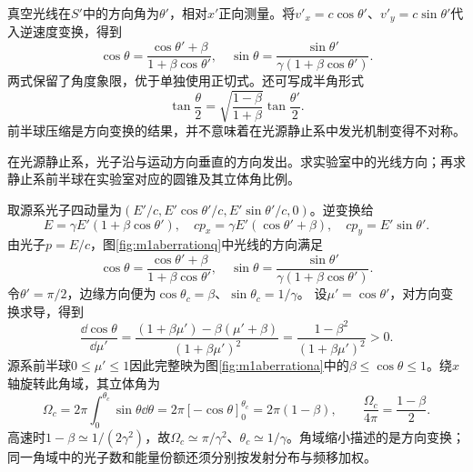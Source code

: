 真空光线在$S'$中的方向角为$\theta'$，相对$x'$正向测量。将$v'_x=c\cos\theta'$、$v'_y=c\sin\theta'$代入逆速度变换，得到
\begin{equation}\label{eq:m1aberration}
 \cos\theta=\frac{\cos\theta'+\beta}{1+\beta\cos\theta'},\quad
 \sin\theta=\frac{\sin\theta'}{\gamma(1+\beta\cos\theta')}.
\end{equation}
两式保留了角度象限，优于单独使用正切式。还可写成半角形式
\[
 \tan\frac\theta2=\sqrt{\frac{1-\beta}{1+\beta}}\tan\frac{\theta'}2.
\]
前半球压缩是方向变换的结果，并不意味着在光源静止系中发光机制变得不对称。

\begin{example}\label{ex:m1aberration}
在光源静止系，光子沿与运动方向垂直的方向发出。求实验室中的光线方向；再求静止系前半球在实验室对应的圆锥及其立体角比例。
\end{example}
\begin{solution}
取源系光子四动量为$(E'/c,E'\cos\theta'/c,E'\sin\theta'/c,0)$。逆变换给
\[
 E=\gamma E'(1+\beta\cos\theta'),\quad
 cp_x=\gamma E'(\cos\theta'+\beta),\quad cp_y=E'\sin\theta'.
\]
由光子$p=E/c$，图\ref{fig:m1aberrationq}中光线的方向满足
\[
 \cos\theta=\frac{\cos\theta'+\beta}{1+\beta\cos\theta'},\quad
 \sin\theta=\frac{\sin\theta'}{\gamma(1+\beta\cos\theta')}.
\]
令$\theta'=\pi/2$，边缘方向便为$\cos\theta_c=\beta$、$\sin\theta_c=1/\gamma$。
设$\mu'=\cos\theta'$，对方向变换求导，得到
\[
 \frac{\dd\cos\theta}{\dd\mu'}
 =\frac{(1+\beta\mu')-\beta(\mu'+\beta)}{(1+\beta\mu')^2}
 =\frac{1-\beta^2}{(1+\beta\mu')^2}>0.
\]
源系前半球$0\leq\mu'\leq1$因此完整映为图\ref{fig:m1aberrationa}中的$\beta\leq\cos\theta\leq1$。绕$x$轴旋转此角域，其立体角为
\[
 \Omega_c=2\pi\int_0^{\theta_c}\sin\theta\dd\theta
 =2\pi[-\cos\theta]_0^{\theta_c}
 =2\pi(1-\beta),\qquad \frac{\Omega_c}{4\pi}=\frac{1-\beta}{2}.
\]
高速时$1-\beta\simeq1/(2\gamma^2)$，故$\Omega_c\simeq\pi/\gamma^2$、$\theta_c\simeq1/\gamma$。角域缩小描述的是方向变换；同一角域中的光子数和能量份额还须分别按发射分布与频移加权。
\end{solution}

